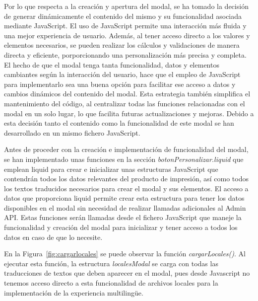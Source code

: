 \documentclass[11pt]{article}
\begin{document}
Por lo que respecta a la creación y apertura del modal, se ha tomado la decisión de generar dinámicamente el contenido del mismo y su funcionalidad
asociada mediante JavaScript. El uso de JavaScript permite una interacción más fluida y una mejor experiencia de usuario. Además, al tener acceso directo 
a los valores y elementos necesarios, se pueden realizar los cálculos y validaciones de manera directa y eficiente, porporcionando una personalización
más precisa y completa. El hecho de que el modal tenga tanta funcionalidad, datos y elementos cambiantes según la interacción del usuario, hace que 
el empleo de JavaScript para implementarlo sea una buena opción para facilitar ese acceso a datos y cambios dinámicos del contenido del modal.
Esta estrategia también simplifica el mantenimiento del código, al centralizar todas las funciones relacionadas con el modal en un solo lugar, lo que facilita
futuras actualizaciones y mejoras. Debido a esta decisión tanto el contenido como la funcionalidad de este modal se han desarrollado en un mismo fichero JavaScript.

Antes de proceder con la creación e implementación de funcionalidad del modal, se han implementado unas funciones en la sección \textit{botonPersonalizar.liquid} que emplean liquid para crear e inicializar unas estructuras JavaScript que 
contendrán todos los datos relevantes del producto de impresión, así como todos los textos traducidos necesarios para crear el modal y sus elementos. El acceso a datos que proporciona liquid permite crear 
esta estructura para tener los datos disponibles en el modal sin necesidad de realizar llamadas adicionales al Admin API. Estas funciones serán llamadas desde el fichero 
JavaScript que maneje la funcionalidad y creación del modal para inicializar y tener acceso a todos los datos en caso de que lo necesite.

En la Figura~\ref{fig:cargarlocales} se puede observar la función \textit{cargarLocales()}. Al ejecutar esta función, la estructura \textit{localesModal} se carga con 
todas las traducciones de textos que deben aparecer en el modal, pues desde Javascript no tenemos acceso directo a esta funcionalidad de archivos locales para la implementación 
de la experiencia multilingüe.
\end{document}
